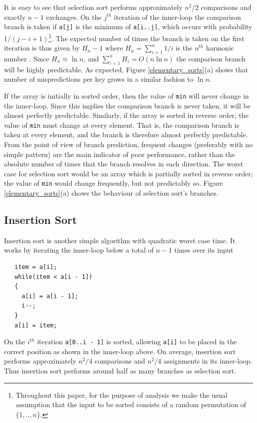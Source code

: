 \documentclass[acmtocl]{acmtrans2m}
\begin{document}
It is easy to see that selection sort performs approximately $n^2/2$ comparisons
and exactly $n - 1$ exchanges. 
On the $j^{th}$ iteration of the inner-loop the comparison branch is taken
if \texttt{a[j]} is the minimum of \texttt{a[i..j]}, which occurs with
probability $1 / (j - i + 1)$\footnote{Throughout this paper, for the purpose of analysis we make
the usual assumption that the input to be sorted consists of a random permutation of $\lbrace1, .., n\rbrace$.}. 
The expected number of times the branch is taken
on the first iteration is thus given by $H_n - 1$ where 
$H_n = \sum_{i = 1}^n 1/i$ is the $n^{th}$ harmonic number \cite{KnuthVol1_97}.
Since $H_n \approx \ln n$, and $\sum_{i = 1}^n H_i = O(n \ln n)$ the comparison branch
will be highly predictable. As expected, Figure \ref{elementary_sorts}(a) shows that number of mispredictions
per key grows in a similar fashion to $\ln n$.

If the array is initially in sorted order, then the value of \texttt{min}
will never change in the inner-loop. Since this implies the comparison branch
is never taken, it will be almost perfectly predictable. Similarly, 
if the array is sorted in reverse order, the value of \texttt{min} must
change at every element. That is, the comparison branch 
is taken at every element, and the branch is therefore almost perfectly
predictable.  From the point of view of branch prediction, frequent
changes (preferably with no simple pattern) are the main indicator of
poor performance, rather than the absolute number of times that the
branch resolves in each direction. The worst case for selection sort
would be an array which is partially sorted in reverse order; the value of
\texttt{min} would change frequently, but not predictably so.
Figure \ref{elementary_sorts}(a) shows the behaviour of selection
sort's branches.

\subsection{Insertion Sort}
\label{insertion_sort}

Insertion sort is another simple algorithm with quadratic
worst case time. It works by iterating the inner-loop below
a total of $n - 1$ times over its input

\begin{verbatim}
   item = a[i];
   while(item < a[i - 1]) 
   {
     a[i] = a[i - 1];
     i--;
   }
   a[i] = item;
\end{verbatim}
On the $i^{th}$ iteration \texttt{a[0..i - 1]} is sorted, allowing
\texttt{a[i]} to be placed in the correct position as shown in
the inner-loop above. On average, insertion sort performs approximately
$n^2/4$ comparisons and $n^2/4$ assignments in its inner-loop. Thus insertion sort
performs around half as many branches as selection sort.
\end{document}
